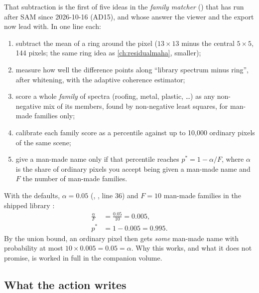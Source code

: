 That subtraction is the first of five ideas in the \emph{family matcher}
() that has run after SAM since 2026-10-16 (AD15), and whose answer the viewer and the export now lead with. In one line each:
\begin{enumerate}
\item subtract the mean of a ring around the pixel ($13\times13$ minus the central $5\times5$, 144 pixels;
  the same ring idea as \cref{ch:residualmaha}, smaller);
\item measure how well the difference points along ``library spectrum minus ring'', after whitening, with the
  adaptive coherence estimator;
\item score a whole \emph{family} of spectra (roofing, metal, plastic, \dots) as any non-negative mix of its
  members, found by non-negative least squares, for man-made families only;
\item calibrate each family score as a percentile against up to 10,000 ordinary pixels of the same scene;
\item give a man-made name only if that percentile reaches $p^*=1-\alpha/F$, where $\alpha$ is the share of
  ordinary pixels you accept being given a man-made name and $F$ the number of man-made families.
\end{enumerate}
With the defaults, $\alpha=0.05$ (, , line 36) and $F=10$ man-made
families in the shipped library :
\begin{align*}
\frac{\alpha}{F} &= \frac{0.05}{10} = 0.005,\\
p^* &= 1-0.005 = 0.995.
\end{align*}
By the union bound, an ordinary pixel then gets \emph{some} man-made name with probability at most
$10\times0.005=0.05=\alpha$. Why this works, and what it does not promise, is worked in full in the companion
volume.

\subsection{What the action writes}

